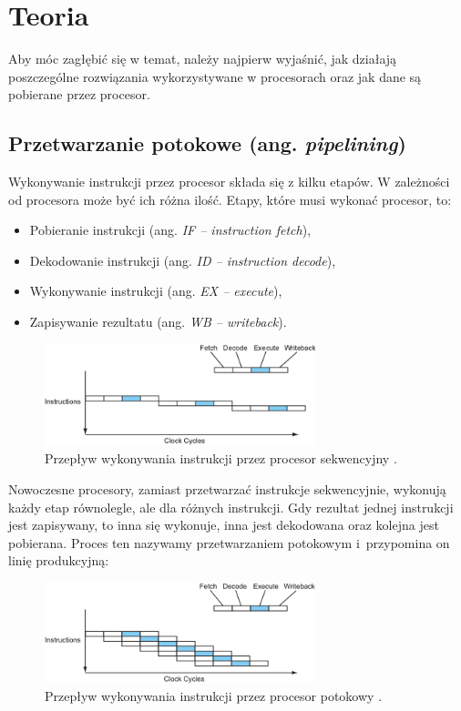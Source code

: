 \chapter{Teoria}
\label{cha:wstep}

Aby móc zagłębić się w temat, należy najpierw wyjaśnić, jak działają poszczególne rozwiązania wykorzystywane w procesorach oraz jak dane są pobierane przez procesor.

\section{Przetwarzanie potokowe (ang. \textit{pipelining})}

Wykonywanie instrukcji przez procesor składa się z kilku etapów. W zależności od procesora może być ich różna ilość. Etapy, które musi wykonać procesor, to:

\begin{itemize}
	\item Pobieranie instrukcji (ang. \textit{IF -- instruction fetch}),
	\item Dekodowanie instrukcji (ang. \textit{ID -- instruction decode}),
	\item Wykonywanie instrukcji (ang. \textit{EX -- execute}),
	\item Zapisywanie rezultatu (ang. \textit{WB -- writeback}).
\end{itemize}


\begin{figure}[!h]
	\centering
	\includegraphics[width=0.7\textwidth]{images/sequential2}
	\caption{Przepływ wykonywania instrukcji przez procesor sekwencyjny \cite{ModernMicroprocessors90MinGuide}.}
\end{figure}

Nowoczesne procesory, zamiast przetwarzać instrukcje sekwencyjnie, wykonują każdy etap równolegle, ale dla różnych instrukcji. Gdy rezultat jednej instrukcji jest zapisywany, to inna się wykonuje, inna jest dekodowana oraz kolejna jest pobierana. Proces ten nazywamy przetwarzaniem potokowym i~przypomina on linię produkcyjną:


\begin{figure}[!h]
	\centering
	\includegraphics[width=0.7\textwidth]{images/pipelined2}
	\caption{Przepływ wykonywania instrukcji przez procesor potokowy \cite{ModernMicroprocessors90MinGuide}.}
\end{figure}

